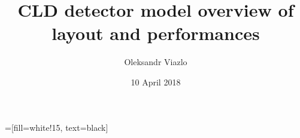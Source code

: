\documentclass[8pt]{beamer}
\newif\ifplacelogo %
\begin{document}
\newcommand{\backupbegin}{
   \newcounter{finalframe}
   \setcounter{finalframe}{\value{framenumber}}
}
\newcommand{\backupend}{
   \setcounter{framenumber}{\value{finalframe}}
}

\newcommand{\myNode}{\tikz[baseline,inner sep=1pt] \node[anchor=base]}

 =[fill=white!15, text=black]



\title[ CLD detector model overview  \hspace{16.5em}\insertframenumber/
\inserttotalframenumber]{ CLD detector model overview of layout and performances}


	\author[Oleksandr Viazlo]{Oleksandr Viazlo \\ 
	}
	
       
	\date{10 April 2018}


	
   	\frame{\titlepage}

   	

\placelogofalse
\end{document}
